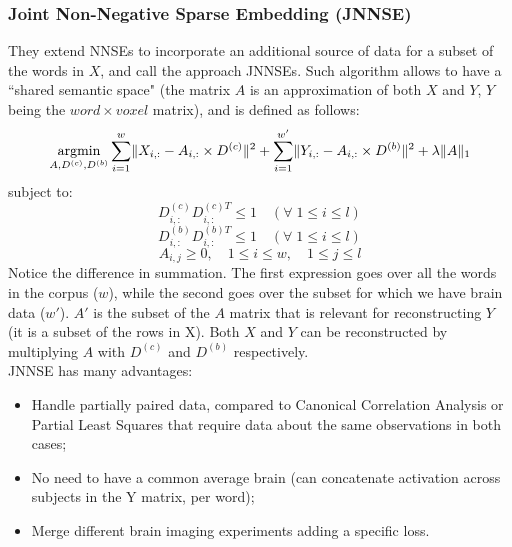 \subsubsection{Joint Non-Negative Sparse Embedding (JNNSE)}
They extend NNSEs to incorporate an additional source of data for a subset of the words in $X$, and call the approach JNNSEs.
Such algorithm allows to have a ``shared semantic space" (the matrix $A$ is an approximation of both $X$ and $Y$, $Y$ being the $word \times voxel$ matrix), and is defined as follows:
\[
\operatorname*{argmin}_{A,D^{(c)},D^{(b)}} \sum_{i=1}^w \lVert X_{i,:} - A_{i,:} \times D^{(c)} \rVert^2 +  \sum_{i=1}^{w'} \lVert Y_{i,:} - A_{i,:} \times D^{(b)} \rVert^2 + \lambda \lVert A\rVert_1
\]
subject to:
\[
D_{i,:}^{(c)}D_{i,:}^{(c)T} \leq 1 \quad(\forall \;1 \leq i \leq l)
\]
\[
D_{i,:}^{(b)}D_{i,:}^{(b)T} \leq 1 \quad(\forall \;1 \leq i \leq l)
\]
\[
A_{i,j} \geq 0,\quad 1 \leq i \leq w,\quad 1 \leq j \leq l
\]
Notice the difference in summation. The first expression goes over all the words in the corpus ($w$), while the second goes over the subset for which we have brain data ($w'$).
$A'$ is the subset of the $A$ matrix that is relevant for reconstructing $Y$ (it is a subset of the rows in X).
Both $X$ and $Y$ can be reconstructed by multiplying $A$ with $D^{(c)}$ and $D^{(b)}$ respectively.\\

JNNSE has many advantages:
\begin{itemize}
    \item Handle partially paired data, compared to Canonical Correlation Analysis or Partial Least Squares that require data about the same observations in both cases;
    \item No need to have a common average brain (can concatenate activation across subjects in the Y matrix, per word);
    \item Merge different brain imaging experiments adding a specific loss.
\end{itemize}

